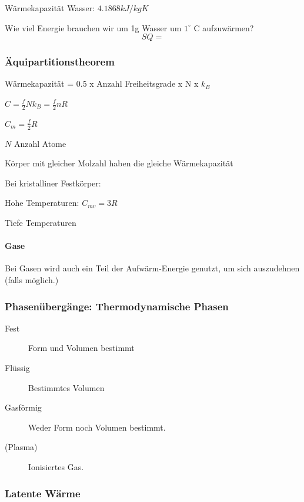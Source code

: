 \documentclass[a4paper]{scrartcl}
\begin{document}
Wärmekapazität Wasser: $4.1868 kJ / kg K$

Wie viel Energie brauchen wir um 1g Wasser um $1^\circ$ C aufzuwärmen?
\[
SQ = 
\]





\subsubsection{Äquipartitionstheorem}

Wärmekapazität = 0.5 x Anzahl Freiheitsgrade x N x $k_B$

$C = \frac{f}{2}N k_B = \frac{f}{2} nR$

$C_m = \frac{f}{2} R$

$N$ Anzahl Atome


Körper mit gleicher Molzahl haben die gleiche Wärmekapazität


Bei kristalliner Festkörper:

Hohe Temperaturen: $C_{mv} = 3R$

Tiefe Temperaturen %

\paragraph{Gase}

Bei Gasen wird auch ein Teil der Aufwärm-Energie genutzt, um sich auszudehnen (falls möglich.)




\subsubsection{Phasenübergänge: Thermodynamische Phasen}

\begin{description}
	\item[Fest] Form und Volumen bestimmt
	\item[Flüssig] Bestimmtes Volumen
	\item[Gasförmig] Weder Form noch Volumen bestimmt.
	\item[(Plasma)] Ionisiertes Gas.
\end{description}


\subsubsection{Latente Wärme}
\end{document}
